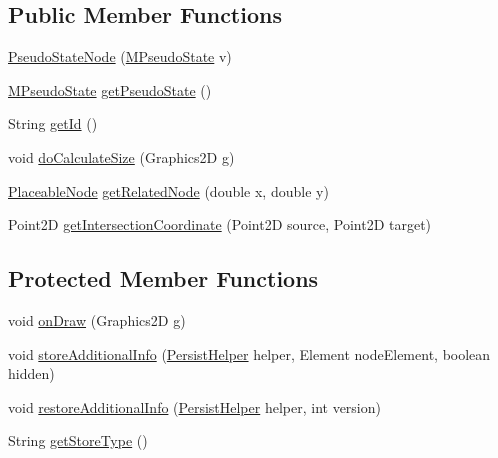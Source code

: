 \subsection*{Public Member Functions}
\begin{DoxyCompactItemize}
\item 
\hyperlink{classorg_1_1tzi_1_1use_1_1gui_1_1views_1_1diagrams_1_1statemachine_1_1_pseudo_state_node_a11a41fefc5cca05adf5ada84e2913b7f}{Pseudo\-State\-Node} (\hyperlink{classorg_1_1tzi_1_1use_1_1uml_1_1mm_1_1statemachines_1_1_m_pseudo_state}{M\-Pseudo\-State} v)
\item 
\hyperlink{classorg_1_1tzi_1_1use_1_1uml_1_1mm_1_1statemachines_1_1_m_pseudo_state}{M\-Pseudo\-State} \hyperlink{classorg_1_1tzi_1_1use_1_1gui_1_1views_1_1diagrams_1_1statemachine_1_1_pseudo_state_node_a2c1fa8b4932d7d9265e2fd3387aa1a32}{get\-Pseudo\-State} ()
\item 
String \hyperlink{classorg_1_1tzi_1_1use_1_1gui_1_1views_1_1diagrams_1_1statemachine_1_1_pseudo_state_node_abfc02cbece160e4c60c010505d299fcb}{get\-Id} ()
\item 
void \hyperlink{classorg_1_1tzi_1_1use_1_1gui_1_1views_1_1diagrams_1_1statemachine_1_1_pseudo_state_node_a688ec07665cf3158a86104a264679245}{do\-Calculate\-Size} (Graphics2\-D g)
\item 
\hyperlink{classorg_1_1tzi_1_1use_1_1gui_1_1views_1_1diagrams_1_1elements_1_1_placeable_node}{Placeable\-Node} \hyperlink{classorg_1_1tzi_1_1use_1_1gui_1_1views_1_1diagrams_1_1statemachine_1_1_pseudo_state_node_aee1d8121cdaddbab96849d067b21d5cf}{get\-Related\-Node} (double x, double y)
\item 
Point2\-D \hyperlink{classorg_1_1tzi_1_1use_1_1gui_1_1views_1_1diagrams_1_1statemachine_1_1_pseudo_state_node_a4ef36116ef94cccf6b8ac942ebfe7f29}{get\-Intersection\-Coordinate} (Point2\-D source, Point2\-D target)
\end{DoxyCompactItemize}
\subsection*{Protected Member Functions}
\begin{DoxyCompactItemize}
\item 
void \hyperlink{classorg_1_1tzi_1_1use_1_1gui_1_1views_1_1diagrams_1_1statemachine_1_1_pseudo_state_node_a6637df19725a1cbe416ec68441dfcd3b}{on\-Draw} (Graphics2\-D g)
\item 
void \hyperlink{classorg_1_1tzi_1_1use_1_1gui_1_1views_1_1diagrams_1_1statemachine_1_1_pseudo_state_node_af7a3de48851d6c187a89648c4afb0f8a}{store\-Additional\-Info} (\hyperlink{classorg_1_1tzi_1_1use_1_1gui_1_1util_1_1_persist_helper}{Persist\-Helper} helper, Element node\-Element, boolean hidden)
\item 
void \hyperlink{classorg_1_1tzi_1_1use_1_1gui_1_1views_1_1diagrams_1_1statemachine_1_1_pseudo_state_node_a4ab4e39c9931d2cb8c6df252163adf9c}{restore\-Additional\-Info} (\hyperlink{classorg_1_1tzi_1_1use_1_1gui_1_1util_1_1_persist_helper}{Persist\-Helper} helper, int version)
\item 
String \hyperlink{classorg_1_1tzi_1_1use_1_1gui_1_1views_1_1diagrams_1_1statemachine_1_1_pseudo_state_node_a6027fce0451643d811354622748f19a5}{get\-Store\-Type} ()
\end{DoxyCompactItemize}
